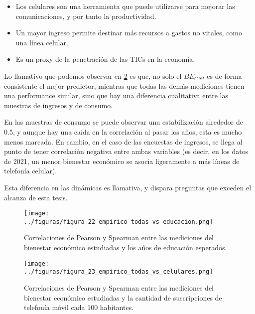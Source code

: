 \begin{itemize}
    \item Los celulares son una herramienta que puede utilizarse para mejorar las comunicaciones, y por tanto la productividad.
    \item Un mayor ingreso permite destinar más recursos a gastos no vitales, como una línea celular.
    \item Es un proxy de la penetración de las TICs en la economía.
\end{itemize}

Lo llamativo que podemos observar en \ref{fig:23} es que, no solo el $BE_{GNI}$ es de forma consistente el mejor predictor, mientras que todas las demás mediciones tienen una performance similar, sino que hay una diferencia cualitativa entre las muestras de ingresos y de consumo.

En las muestras de consumo se puede observar una estabilización alrededor de 0.5, y aunque hay una caída en la correlación al pasar los años, esta es mucho menos marcada. En cambio, en el caso de las encuestas de ingresos, se llega al punto de tener correlación negativa entre ambas variables (es decir, en los datos de 2021, un menor bienestar económico se asocia ligeramente a más líneas de telefonía celular).

Esta diferencia en las dinámicas es llamativa, y dispara preguntas que exceden el alcanza de esta tesis.

\begin{figure}[H] %
    \centering %
    \texttt{[image: ../figuras/figura\_22\_empirico\_todas\_vs\_educacion.png]} %
    \caption{Correlaciones de Pearson y Spearman entre las mediciones del bienestar económico estudiadas y los años de educación esperados. \cite{worldbank_gender_data}}
    \label{fig:22} %
\end{figure}


\begin{figure}[H] %
    \centering %
    \texttt{[image: ../figuras/figura\_23\_empirico\_todas\_vs\_celulares.png]} %
    \caption{Correlaciones de Pearson y Spearman entre las mediciones del bienestar económico estudiadas y la cantidad de suscripciones de telefonía móvil cada 100 habitantes. \cite{worldbank_gender_data}}
    \label{fig:23} %
\end{figure}
